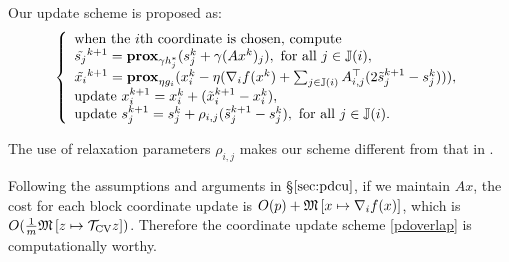 {{{%
Our update scheme is proposed as: 
\begin{equation}
\left\{
\begin{array}{l}
\text{when the }i\text{th coordinate is chosen, compute}\\
\tilde{s_j}^{k+1}=\prox_{\gamma h_j^*} (s_j^k+\gamma (Ax^k)_j),~\mbox{for all}~ j\in\JJ(i),\\
\tilde{x_i}^{k+1}=\prox_{\eta g_i}(x_i^k-\eta(\nabla_i f(x^k)+\sum_{j\in\JJ(i)}A_{i,j}^\top(2\tilde{s}_j^{k+1}-s_j^k))),\\
\text{update }x_i^{k+1}=x_i^k+(\tilde{x}_i^{k+1}-x_i^k), \\
\text{update }s_j^{k+1}=s_j^k+\rho_{i,j}(\tilde{s}_j^{k+1}-s_j^k),~\mbox{for all}~ j\in\JJ(i).
\end{array}
\right.\label{pdoverlap}
\end{equation}
\begin{remark}
The use of relaxation parameters $\rho_{i,j}$ makes our scheme different from that in \cite{pesquet2014class}. %
\end{remark}
Following the assumptions and arguments in \S$\ref{sec:pdcu}$, if we maintain $Ax$, the cost for each block coordinate update is $O(p)+\mathfrak{M}\left[{x}\mapsto {\nabla_i f(x)}\right]$, which is $O(\frac{1}{m}\mathfrak{M}\left[{z}\mapsto {{{\mathcal{T}}_{\textnormal{CV}}}z}\right])$. Therefore the coordinate update scheme \eqref{pdoverlap} is computationally worthy.

}}}
